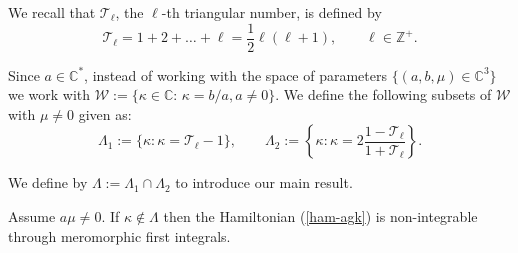 \documentclass[final]{siamart0516}
\begin{document}
We recall that ${\mathcal T}_\ell$, the $\ell$-th triangular number, is  
defined by
$${\mathcal T}_\ell = 1 + 2 + \dots + \ell = \frac{1}{2}\ell (\ell+1),  \qquad \ell\in\mathbb{Z}^+.$$

Since $a\in\mathbb{C}^*$, instead of working with the space of parameters
$\{(a,b,\mu)\in\mathbb{C}^3\}$ we work with  $\mathcal W:=\{\kappa\in
\mathbb{C}: \, \kappa=b/a, a\neq 0\}$.
We define the following subsets of $\mathcal W$ with $\mu\neq 0$ given as:  $$\Lambda_1:=\{
\kappa: \kappa= \mathcal T_\ell -1\},\qquad  
\Lambda_2:=\left\{\kappa: \kappa= 2\frac{1-\mathcal{T}_{\ell}}{1+\mathcal{T}_{\ell}}\right\}.$$

We define by $\Lambda:=\Lambda_1\cap\Lambda_2$ to introduce our main
result.
\begin{theorem} Assume $a\mu\neq 0$. If $\kappa\notin \Lambda$ then the Hamiltonian (\ref{ham-agk}) is 
non-integrable through meromorphic first integrals.
\end{theorem}
\end{document}
